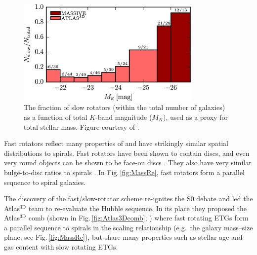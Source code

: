 	\begin{figure}
		\centering
		\includegraphics[width=0.8\textwidth]{introduction/slowRotFraction.jpeg}
		\caption[Proportion of slow rotating galaxies as a function of mass]{The fraction of slow rotators (within the total number of galaxies) as a function of total $K$-band magnitude ($M_K$), used as a proxy for total stellar mass. Figure courtesy of \citet{Veale2017}.}
		\label{fig:SlowRotFrac}
	\end{figure}

	Fast rotators reflect many properties of and have strikingly similar spatial distributions to spirals. Fast rotators have been shown to contain discs, and even very round objects can be shown to be face-on discs \citep[e.g.][]{Cappellari2013a, Weijmans2014}. They also have very similar bulge-to-disc ratios to spirals \citep{Krajnovic2013}. In Fig.\,\ref{fig:MassRe}, fast rotators form a parallel sequence to spiral galaxies.

	The discovery of the fast/slow-rotator scheme re-ignites the S0 debate and led the Atlas$^\text{3D}$ team to re-evaluate the Hubble sequence. In its place they proposed the Atlas$^\text{3D}$ comb (shown in Fig.\,\ref{fig:Atlas3Dcomb}; \citealt{Cappellari2011a}) where fast rotating ETGs form a parallel sequence to spirals in the scaling relationship (e.g.\ the galaxy mass--size plane; see Fig.\,\ref{fig:MassRe}), but share many properties such as stellar age and gas content with slow rotating ETGs. 

